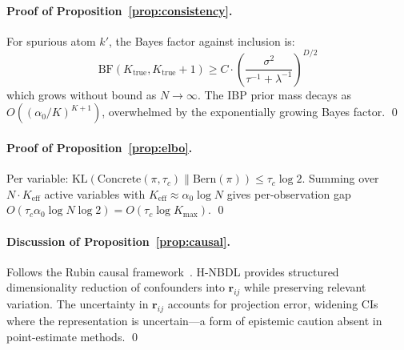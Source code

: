 \documentclass[11pt,a4paper]{article}
\theoremstyle{definition}
\begin{document}
\paragraph{Proof of Proposition~\ref{prop:consistency}.}
For spurious atom $k'$, the Bayes factor against inclusion is:
\[
  \mathrm{BF}(K_{\mathrm{true}}, K_{\mathrm{true}}{+}1) \geq C \cdot \left(\frac{\sigma^2}{\tau^{-1} + \lambda^{-1}}\right)^{D/2}
\]
which grows without bound as $N \to \infty$. The IBP prior mass decays as $O((\alpha_0/K)^{K+1})$, overwhelmed by the exponentially growing Bayes factor. \qed

\paragraph{Proof of Proposition~\ref{prop:elbo}.}
Per variable: $\mathrm{KL}(\text{Concrete}(\pi, \tau_c) \| \text{Bern}(\pi)) \leq \tau_c \log 2$. Summing over $N \cdot K_{\mathrm{eff}}$ active variables with $K_{\mathrm{eff}} \approx \alpha_0 \log N$ gives per-observation gap $O(\tau_c \alpha_0 \log N \log 2) = O(\tau_c \log K_{\max})$. \qed

\paragraph{Discussion of Proposition~\ref{prop:causal}.}
Follows the Rubin causal framework~\citep{rubin1974}. H-NBDL provides structured dimensionality reduction of confounders into $\mathbf{r}_{ij}$ while preserving relevant variation. The uncertainty in $\mathbf{r}_{ij}$ accounts for projection error, widening CIs where the representation is uncertain---a form of epistemic caution absent in point-estimate methods. \qed
\end{document}
